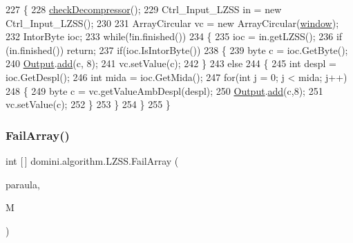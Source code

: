 \begin{DoxyCode}
227     \{
228         \hyperlink{classdomini_1_1algorithm_1_1Algorithm_a6b738342cc7169893fa60d593f5a13db}{checkDecompressor}();
229         Ctrl\_Input\_LZSS in = \textcolor{keyword}{new} Ctrl\_Input\_LZSS();
230 
231         ArrayCircular vc = \textcolor{keyword}{new} ArrayCircular(\hyperlink{classdomini_1_1algorithm_1_1LZSS_a00d9f2e9bc2baa39513fad040b8e7123}{window});
232         IntorByte ioc;
233         \textcolor{keywordflow}{while}(!in.finished())
234         \{
235             ioc = in.getLZSS();
236             \textcolor{keywordflow}{if} (in.finished()) \textcolor{keywordflow}{return};
237             \textcolor{keywordflow}{if}(ioc.IsIntorByte())
238             \{
239                 byte c = ioc.GetByte();
240                 \hyperlink{classdomini_1_1algorithm_1_1Algorithm_a4de9955411c656325adc391ef570c082}{Output}.\hyperlink{classpersistencia_1_1output_1_1Ctrl__Output_a8c5aa5a6acb5259faeb1c05c71ddd21c}{add}(c, 8);
241                 vc.setValue(c);
242             \}
243             \textcolor{keywordflow}{else}
244             \{
245                 \textcolor{keywordtype}{int} despl = ioc.GetDespl();
246                 \textcolor{keywordtype}{int} mida = ioc.GetMida();
247                 \textcolor{keywordflow}{for}(\textcolor{keywordtype}{int} j = 0; j < mida; j++)
248                 \{
249                     byte c = vc.getValueAmbDespl(despl);
250                     \hyperlink{classdomini_1_1algorithm_1_1Algorithm_a4de9955411c656325adc391ef570c082}{Output}.\hyperlink{classpersistencia_1_1output_1_1Ctrl__Output_a8c5aa5a6acb5259faeb1c05c71ddd21c}{add}(c,8);
251                     vc.setValue(c);
252                 \}
253             \}
254         \}
255     \}
\end{DoxyCode}
\mbox{\label{classdomini_1_1algorithm_1_1LZSS_a56733a42f84d7a58cc5db9ea5f67835f}} 
\subsubsection{\texorpdfstring{Fail\+Array()}{FailArray()}}
{\footnotesize\ttfamily int \mbox{[}$\,$\mbox{]} domini.\+algorithm.\+L\+Z\+S\+S.\+Fail\+Array (\begin{DoxyParamCaption}\item[{Array\+List$<$ Byte $>$}]{paraula,  }\item[{int}]{M }\end{DoxyParamCaption})\hspace{0.3cm}{\ttfamily [inline]}}


